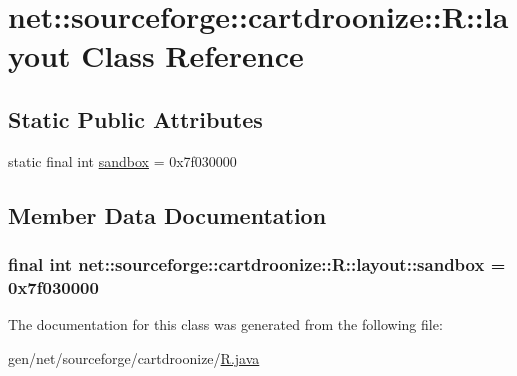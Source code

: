 \hypertarget{classnet_1_1sourceforge_1_1cartdroonize_1_1R_1_1layout}{
\section{net::sourceforge::cartdroonize::R::layout Class Reference}
\label{classnet_1_1sourceforge_1_1cartdroonize_1_1R_1_1layout}
}
\subsection*{Static Public Attributes}
\begin{DoxyCompactItemize}
\item 
static final int \hyperlink{classnet_1_1sourceforge_1_1cartdroonize_1_1R_1_1layout_af00caf6d75c746d0082d1ef1df06987c}{sandbox} = 0x7f030000
\end{DoxyCompactItemize}


\subsection{Member Data Documentation}
\hypertarget{classnet_1_1sourceforge_1_1cartdroonize_1_1R_1_1layout_af00caf6d75c746d0082d1ef1df06987c}{
\subsubsection[{sandbox}]{\setlength{\rightskip}{0pt plus 5cm}final int {\bf net::sourceforge::cartdroonize::R::layout::sandbox} = 0x7f030000}}
\label{classnet_1_1sourceforge_1_1cartdroonize_1_1R_1_1layout_af00caf6d75c746d0082d1ef1df06987c}


The documentation for this class was generated from the following file:\begin{DoxyCompactItemize}
\item 
gen/net/sourceforge/cartdroonize/\hyperlink{R_8java}{R.java}\end{DoxyCompactItemize}
